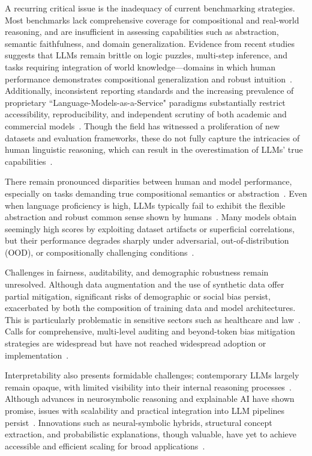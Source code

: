 \documentclass[11pt]{article}
\begin{document}
A recurring critical issue is the inadequacy of current benchmarking strategies. Most benchmarks lack comprehensive coverage for compositional and real-world reasoning, and are insufficient in assessing capabilities such as abstraction, semantic faithfulness, and domain generalization. Evidence from recent studies suggests that LLMs remain brittle on logic puzzles, multi-step inference, and tasks requiring integration of world knowledge—domains in which human performance demonstrates compositional generalization and robust intuition~\cite{ref17,ref18,ref19,ref31,ref32,ref34,ref79,ref98}. Additionally, inconsistent reporting standards and the increasing prevalence of proprietary ``Language-Models-as-a-Service" paradigms substantially restrict accessibility, reproducibility, and independent scrutiny of both academic and commercial models~\cite{ref13,ref34,ref47,ref52,ref106,ref107,ref108}. Though the field has witnessed a proliferation of new datasets and evaluation frameworks, these do not fully capture the intricacies of human linguistic reasoning, which can result in the overestimation of LLMs' true capabilities~\cite{ref44,ref77,ref79,ref98,ref99,ref102,ref103}.

There remain pronounced disparities between human and model performance, especially on tasks demanding true compositional semantics or abstraction~\cite{ref31,ref32,ref44,ref98,ref99}. Even when language proficiency is high, LLMs typically fail to exhibit the flexible abstraction and robust common sense shown by humans~\cite{ref44,ref99}. Many models obtain seemingly high scores by exploiting dataset artifacts or superficial correlations, but their performance degrades sharply under adversarial, out-of-distribution (OOD), or compositionally challenging conditions~\cite{ref55,ref77,ref98}.

Challenges in fairness, auditability, and demographic robustness remain unresolved. Although data augmentation and the use of synthetic data offer partial mitigation, significant risks of demographic or social bias persist, exacerbated by both the composition of training data and model architectures. This is particularly problematic in sensitive sectors such as healthcare and law~\cite{ref2,ref15,ref18,ref19,ref49,ref50,ref55,ref90,ref91}. Calls for comprehensive, multi-level auditing and beyond-token bias mitigation strategies are widespread but have not reached widespread adoption or implementation~\cite{ref15,ref18,ref49,ref89,ref90}.

Interpretability also presents formidable challenges; contemporary LLMs largely remain opaque, with limited visibility into their internal reasoning processes~\cite{ref24,ref34,ref37,ref38,ref41,ref43,ref48,ref54,ref89,ref92,ref93,ref94}. Although advances in neurosymbolic reasoning and explainable AI have shown promise, issues with scalability and practical integration into LLM pipelines persist~\cite{ref38,ref48,ref54,ref89,ref92,ref93,ref94}. Innovations such as neural-symbolic hybrids, structural concept extraction, and probabilistic explanations, though valuable, have yet to achieve accessible and efficient scaling for broad applications~\cite{ref43,ref48,ref54,ref92,ref93,ref94}.
\end{document}
